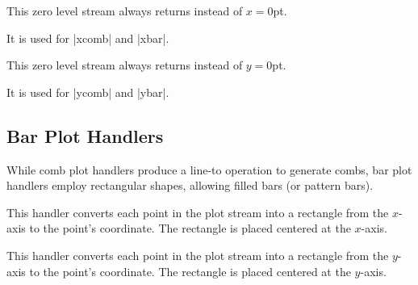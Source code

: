 \begin{command}{\pgfplotxzerolevelstreamconstant{}}
    This zero level stream always returns  instead of $x=0$pt.

    It is used for |xcomb| and |xbar|.
\end{command}

\begin{command}{\pgfplotyzerolevelstreamconstant{}}
    This zero level stream always returns  instead of $y=0$pt.

    It is used for |ycomb| and |ybar|.
\end{command}


\subsection{Bar Plot Handlers}
\label{section-plotlib-bar-handlers}

While comb plot handlers produce a line-to operation to generate combs, bar
plot handlers employ rectangular shapes, allowing filled bars (or pattern
bars).

\begin{command}{\pgfplothandlerybar}
    This handler converts each point in the plot stream into a rectangle from
    the $x$-axis to the point's coordinate. The rectangle is placed centered at
    the $x$-axis.
\begin{codeexample}[]
\end{codeexample}
\end{command}

\begin{command}{\pgfplothandlerxbar}
    This handler converts each point in the plot stream into a rectangle from
    the $y$-axis to the point's coordinate. The rectangle is placed centered at
    the $y$-axis.
\begin{codeexample}[]
\end{codeexample}
\end{command}

